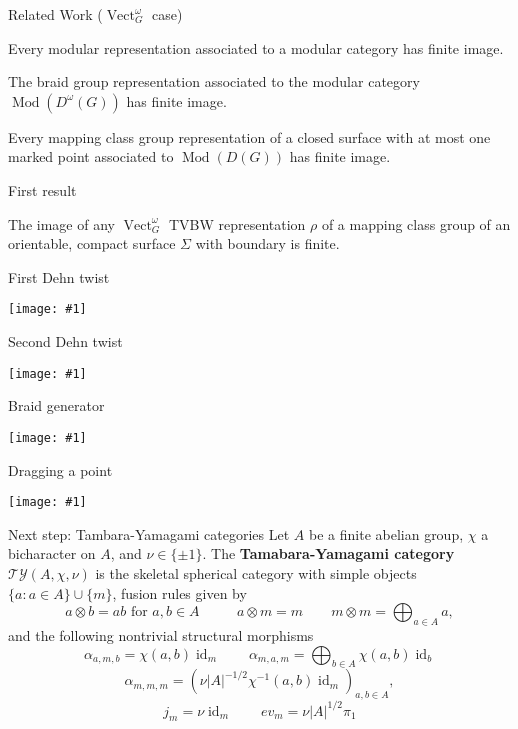 \documentclass{beamer}
\DeclareMathOperator{\id}{id}
\DeclareMathOperator{\Vect}{Vect}
\DeclareMathOperator{\Mod}{Mod}
\newcommand{\img}[1]{
\vfill
\centering
\texttt{[image: \#1]}
\vfill
}
\begin{document}
\begin{frame}{Related Work ($\Vect_G^\omega$ case)}
\begin{theorem}[Ng--Schauenberg]
Every modular representation associated to a modular category has finite image.
\end{theorem}

\begin{theorem}
The braid group representation associated to 
the modular category $\Mod(D^\omega(G))$ has finite image.
\end{theorem}

\begin{theorem}
Every mapping class group representation of a closed surface with at most one marked point associated to $\Mod(D(G))$ has finite image.
\end{theorem}
\end{frame}

\begin{frame}{First result}
\begin{theorem}[G.]
The image of any $\Vect^\omega_G$ TVBW representation $\rho$ of a mapping class group of an orientable, compact surface $\Sigma$ with boundary is finite.
\end{theorem}
\end{frame}

\begin{frame}{First Dehn twist}
\img{t1}
\end{frame}

\begin{frame}{Second Dehn twist}
\img{t2}
\end{frame}

\begin{frame}{Braid generator}
\img{t3}
\end{frame}

\begin{frame}{Dragging a point}
\img{t4}
\end{frame}



\begin{frame}{Next step: Tambara-Yamagami categories}
Let $A$ be a finite abelian group, $\chi$ a bicharacter on $A$,
and $\nu \in \{\pm 1\}$. The \textbf{Tamabara-Yamagami category} $\mathcal{TY}(A, \chi, \nu)$ is the skeletal spherical category with
simple objects $\{a : a \in A\} \cup \{m\}$, fusion rules given by
\[ a \otimes b = ab \text{ for $a,b \in A$ } \qquad 
a \otimes m = m \qquad
m \otimes m = \bigoplus_{a \in A} a, 
\]
and the following nontrivial structural morphisms
\[
\alpha_{a,m,b} = \chi(a,b) \id_m \qquad  
\alpha_{m,a,m}  = \bigoplus_{b \in A} \chi(a,b) \id_b 
\]
\[
\alpha_{m,m,m} = (\nu |A|^{-1/2} \chi^{-1}(a,b) \id_m)_{a,b \in A},
\]
\[
j_m = \nu \id_m  \qquad  ev_m = \nu |A|^{1/2} \pi_1
\]
\end{frame}
\end{document}
